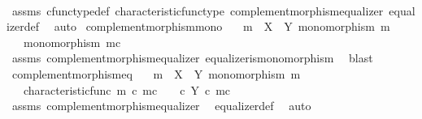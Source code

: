 \begin{isabellebody}
%
\isadelimproof
\ \ %
\endisadelimproof
%
\isatagproof
{}\isamarkupfalse%
\ assms\ cfunc{\isacharunderscore}{\kern0pt}type{\isacharunderscore}{\kern0pt}def\ characteristic{\isacharunderscore}{\kern0pt}func{\isacharunderscore}{\kern0pt}type\ complement{\isacharunderscore}{\kern0pt}morphism{\isacharunderscore}{\kern0pt}equalizer\ equalizer{\isacharunderscore}{\kern0pt}def\ \isamarkupfalse%
\ auto%
\endisatagproof
{\isafoldproof}%
%
\isadelimproof
\isanewline
%
\endisadelimproof
\isanewline
{}\isamarkupfalse%
\ complement{\isacharunderscore}{\kern0pt}morphism{\isacharunderscore}{\kern0pt}mono{\isacharcolon}{\kern0pt}\isanewline
\ \ \ {\isachardoublequoteopen}m\ {\isacharcolon}{\kern0pt}\ X\ {\isasymrightarrow}\ Y{\isachardoublequoteclose}\ {\isachardoublequoteopen}monomorphism\ m{\isachardoublequoteclose}\isanewline
\ \ \ {\isachardoublequoteopen}monomorphism\ m\isactrlsup c{\isachardoublequoteclose}\isanewline
%
\isadelimproof
\ \ %
\endisadelimproof
%
\isatagproof
{}\isamarkupfalse%
\ assms\ complement{\isacharunderscore}{\kern0pt}morphism{\isacharunderscore}{\kern0pt}equalizer\ equalizer{\isacharunderscore}{\kern0pt}is{\isacharunderscore}{\kern0pt}monomorphism\ \isamarkupfalse%
\ blast%
\endisatagproof
{\isafoldproof}%
%
\isadelimproof
\isanewline
%
\endisadelimproof
\isanewline
{}\isamarkupfalse%
\ complement{\isacharunderscore}{\kern0pt}morphism{\isacharunderscore}{\kern0pt}eq{\isacharcolon}{\kern0pt}\isanewline
\ \ \ {\isachardoublequoteopen}m\ {\isacharcolon}{\kern0pt}\ X\ {\isasymrightarrow}\ Y{\isachardoublequoteclose}\ {\isachardoublequoteopen}monomorphism\ m{\isachardoublequoteclose}\isanewline
\ \ \ {\isachardoublequoteopen}characteristic{\isacharunderscore}{\kern0pt}func\ m\ {\isasymcirc}\isactrlsub c\ m\isactrlsup c\ \ {\isacharequal}{\kern0pt}\ {\isacharparenleft}{\kern0pt}{\isasymf}\ {\isasymcirc}\isactrlsub c\ {\isasymbeta}\isactrlbsub Y\isactrlesub {\isacharparenright}{\kern0pt}\ {\isasymcirc}\isactrlsub c\ m\isactrlsup c{\isachardoublequoteclose}\isanewline
%
\isadelimproof
\ \ %
\endisadelimproof
%
\isatagproof
{}\isamarkupfalse%
\ assms\ complement{\isacharunderscore}{\kern0pt}morphism{\isacharunderscore}{\kern0pt}equalizer\ \isamarkupfalse%
\ equalizer{\isacharunderscore}{\kern0pt}def\ \isamarkupfalse%
\ auto%
\endisatagproof
{\isafoldproof}%
%
\isadelimproof
\isanewline
%
\endisadelimproof
\isanewline
{}\isamarkupfalse%

\end{isabellebody}
